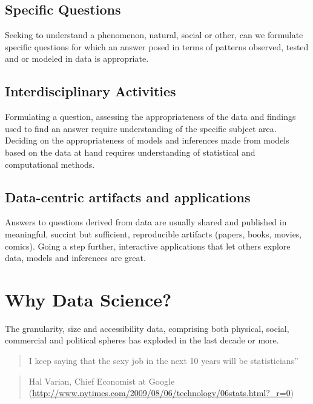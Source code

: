 \documentclass[]{book}
\theoremstyle{definition}
\theoremstyle{definition}
\theoremstyle{remark}
\begin{document}
\subsection{Specific Questions}\label{specific-questions}

Seeking to understand a phenomenon, natural, social or other, can we
formulate specific questions for which an answer posed in terms of
patterns observed, tested and or modeled in data is appropriate.

\subsection{Interdisciplinary
Activities}\label{interdisciplinary-activities}

Formulating a question, assessing the appropriateness of the data and
findings used to find an answer require understanding of the specific
subject area. Deciding on the appropriateness of models and inferences
made from models based on the data at hand requires understanding of
statistical and computational methods.

\subsection{Data-centric artifacts and
applications}\label{data-centric-artifacts-and-applications}

Answers to questions derived from data are usually shared and published
in meaningful, succint but sufficient, reproducible artifacts (papers,
books, movies, comics). Going a step further, interactive applications
that let others explore data, models and inferences are great.

\section{Why Data Science?}\label{why-data-science}

The granularity, size and accessibility data, comprising both physical,
social, commercial and political spheres has exploded in the last decade
or more.

\begin{quote}
I keep saying that the sexy job in the next 10 years will be
statisticians''
\end{quote}

\begin{quote}
Hal Varian, Chief Economist at Google
(\url{http://www.nytimes.com/2009/08/06/technology/06stats.html?_r=0})
\end{quote}
\end{document}
